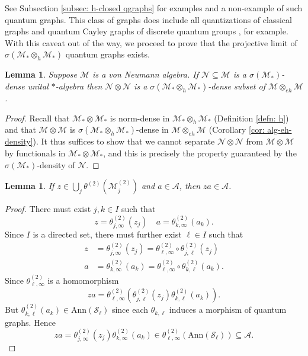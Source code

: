 \documentclass[12pt]{article}
\newtheorem{lemma}[theorem]{Lemma}
\theoremstyle{definition}
\newcommand{\mc}[1]{\mathcal{#1}}
\newcommand{\<}{\langle}
\renewcommand{\>}{\rangle}
\newcommand{\Ann}{\text{Ann}}
\renewcommand{\subset}{\subseteq}
\newcommand{\eh}{\otimes_{eh}}
\newcommand{\h}{\otimes_{h}}
\begin{document}
See Subsection \ref{subsec: h-closed qgraphs} for examples and a non-example of such quantum graphs. This class of graphs does include all quantizations of classical graphs and quantum Cayley graphs of discrete quantum groups \cite{quantum-cayley}, for example. With this caveat out of the way, we proceed to prove that the projective limit of $\sigma(\mc M_* \h \mc M_*)$ quantum graphs exists.

\begin{lemma} \label{lem: density 1}
    Suppose $\mc M$ is a von Neumann algebra. If $\mc N \subseteq \mc M$ is a $\sigma(\mc M_*)$-dense unital $*$-algebra then $\mc N \otimes \mc N$ is a $\sigma(\mc M_* \otimes_{h} \mc M_*)$-dense subset of $\mc M \otimes_{eh} \mc M$.
\end{lemma}
\begin{proof}
    Recall that $\mc M_* \otimes \mc M_*$ is norm-dense in $\mc M_* \h \mc M_*$ (Definition \ref{defn: h}) and that $\mc M \otimes \mc M$ is $\sigma(\mc M_* \otimes_{h} \mc M_*)$-dense in $\mc M \eh \mc M$ (Corollary \ref{cor: alg-eh-density}). It thus suffices to show that we cannot separate $\mc N \otimes \mc N$ from $\mc M \otimes \mc M$ by functionals in $\mc M_* \otimes \mc M_*$, and this is precisely the property guaranteed by the $\sigma(\mc M_*)$-density of $\mc N$.
\end{proof}

\begin{lemma} \label{lem: alg-left-ideal}
    If $z \in \bigcup_j \theta^{(2)}(\mc M_j^{(2)})$ and $a \in \mc A$, then $za \in \mc A$.
\end{lemma}
\begin{proof}
    There must exist $j,k\in I$ such that 
    \[
    z = \theta_{j,\infty}^{(2)} (z_j) \quad a = \theta_{k,\infty}^{(2)}(a_k).
    \]
    Since $I$ is a directed set, there must further exist $\ell \in I$ such that
    \begin{align*}
    z &= \theta_{j,\infty}^{(2)}(z_j) = \theta_{\ell,\infty}^{(2)} \circ \theta_{j,\ell}^{(2)}(z_j) \\
    a &= \theta_{k,\infty}^{(2)}(a_k) = \theta_{\ell,\infty}^{(2)} \circ \theta_{k,\ell}^{(2)}(a_k).
    \end{align*}
    Since $\theta_{\ell,\infty}^{(2)}$ is a homomorphism
    \[
    za = \theta_{\ell,\infty}^{(2)}(\theta_{j,\ell}^{(2)}(z_j)\theta_{k,\ell}^{(2)}(a_k)).
    \]
    But $\theta_{k,\ell}^{(2)}(a_k) \in \Ann(\mc S_\ell)$ since each $\theta_{k,\ell}$ induces a morphism of quantum graphs. Hence 
    \[
    za = \theta_{j,\infty}^{(2)}(z_j)\theta_{k,\infty}^{(2)}(a_k) \in \theta_{\ell,\infty}^{(2)} (\Ann(\mc S_\ell)) \subset \mc A.
    \]
\end{proof}
\end{document}
